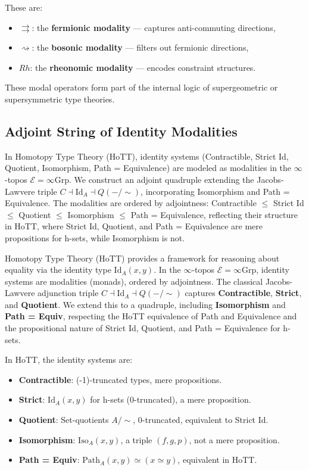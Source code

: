 \documentclass{article}
\begin{document}
These are:
\begin{itemize}
  \item $\rightrightarrows$: the \textbf{fermionic modality} — captures anti-commuting directions,
  \item $\rightsquigarrow$: the \textbf{bosonic modality} — filters out fermionic directions,
  \item $Rh$: the \textbf{rheonomic modality} — encodes constraint structures.
\end{itemize}

These modal operators form part of the internal logic of supergeometric or supersymmetric type theories.

\newpage
\subsection{Adjoint String of Identity Modalities}
In Homotopy Type Theory (HoTT), identity systems (Contractible, Strict Id, Quotient, Isomorphism, Path = Equivalence) are modeled as modalities in the $\infty$-topos $\mathcal{E} = \infty\text{Grp}$. We construct an adjoint quadruple extending the Jacobs-Lawvere triple $C \dashv \text{Id}_A \dashv Q(-/\sim)$, incorporating Isomorphism and Path = Equivalence. The modalities are ordered by adjointness: Contractible $\leq$ Strict Id $\leq$ Quotient $\leq$ Isomorphism $\leq$ Path = Equivalence, reflecting their structure in HoTT, where Strict Id, Quotient, and Path = Equivalence are mere propositions for h-sets, while Isomorphism is not.

Homotopy Type Theory (HoTT) provides a framework for reasoning
about equality via the identity type $\text{Id}_A(x,y)$.
In the $\infty$-topos $\mathcal{E} = \infty\text{Grp}$,
identity systems are modalities (monads), ordered by adjointness.
The classical Jacobs-Lawvere adjunction triple $C \dashv \text{Id}_A \dashv Q(-/\sim)$
captures \textbf{Contractible}, \textbf{Strict}, and \textbf{Quotient}.
We extend this to a quadruple, including \textbf{Isomorphism} and \textbf{Path = Equiv},
respecting the HoTT equivalence of Path and Equivalence and the propositional
nature of Strict Id, Quotient, and Path = Equivalence for h-sets.

\begin{definition}
In HoTT, the identity systems are:
\begin{itemize}
    \item \textbf{Contractible}: (-1)-truncated types, mere propositions.
    \item \textbf{Strict}: $\text{Id}_A(x,y)$ for h-sets (0-truncated), a mere proposition.
    \item \textbf{Quotient}: Set-quotients $A / \sim$, 0-truncated, equivalent to Strict Id.
    \item \textbf{Isomorphism}: $\text{Iso}_A(x,y)$, a triple $(f, g, p)$, not a mere proposition.
    \item \textbf{Path = Equiv}: $\text{Path}_A(x,y) \simeq (x \simeq y)$, equivalent in HoTT.
\end{itemize}
\end{definition}
\end{document}
